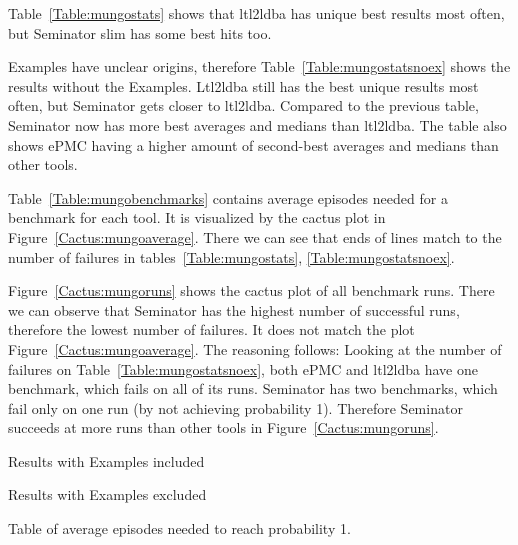 \documentclass[
	digital,
nolof, nolot
]{fithesis3}
\begin{document}
	Table~\ref{Table:mungostats} shows that ltl2ldba has unique best results most often, but Seminator slim has some best hits too.
	
	Examples have unclear origins, therefore Table~\ref{Table:mungostatsnoex} shows the results without the Examples. Ltl2ldba still has the best unique results most often, but Seminator gets closer to ltl2ldba. Compared to the previous table, Seminator now has more best averages and medians than ltl2ldba. The table also shows ePMC having a higher amount of second-best averages and medians than other tools. 
	
	Table~\ref{Table:mungobenchmarks} contains average episodes needed for a benchmark for each tool. It is visualized by the cactus plot in Figure~\ref{Cactus:mungoaverage}. There we can see that ends of lines match to the number of failures in tables~\ref{Table:mungostats}, \ref{Table:mungostatsnoex}.
	
	Figure~\ref{Cactus:mungoruns} shows the cactus plot of all benchmark runs. There we can observe that Seminator has the highest number of successful runs, therefore the lowest number of failures. It does not match the plot Figure~\ref{Cactus:mungoaverage}. The reasoning follows: Looking at the number of failures on Table~\ref{Table:mungostatsnoex}, both ePMC and ltl2ldba have one benchmark, which fails on all of its runs. Seminator has two benchmarks, which fail only on one run (by not achieving probability 1). Therefore Seminator succeeds at more runs than other tools in Figure~\ref{Cactus:mungoruns}.
	
	
	
	\begin{table}[ht]
		\centering
		
		\caption{Results with Examples included}
		\label{Table:mungostats}
		
	\end{table}
	
	\begin{table}[ht]
		\centering
		
		\caption{Results with Examples excluded }
		\label{Table:mungostatsnoex}
		
	\end{table}
	
	\begin{table}[ht]
		\centering
		
		\caption{Table of average episodes needed to reach probability 1.}
		\label{Table:mungobenchmarks}
		
	\end{table}
	
\end{document}
